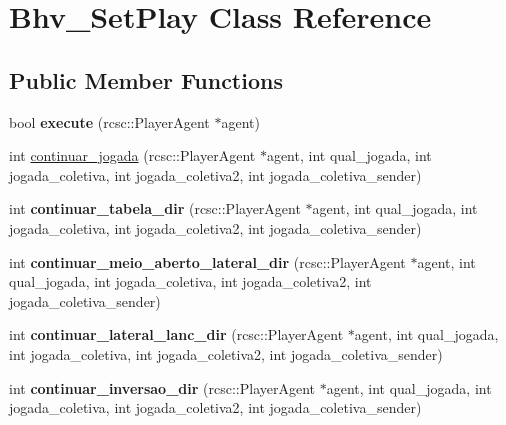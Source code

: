 \hypertarget{classBhv__SetPlay}{
\section{Bhv\_\-SetPlay Class Reference}
\label{classBhv__SetPlay}
}
\subsection*{Public Member Functions}
\begin{DoxyCompactItemize}
\item 
\hypertarget{classBhv__SetPlay_a6ba77fe4b32a7e96e334ca8d24c29bad}{
bool {\bfseries execute} (rcsc::PlayerAgent $\ast$agent)}
\label{classBhv__SetPlay_a6ba77fe4b32a7e96e334ca8d24c29bad}

\item 
int \hyperlink{classBhv__SetPlay_a344fa9403b413306fdcc2a45bcf789fd}{continuar\_\-jogada} (rcsc::PlayerAgent $\ast$agent, int qual\_\-jogada, int jogada\_\-coletiva, int jogada\_\-coletiva2, int jogada\_\-coletiva\_\-sender)
\item 
\hypertarget{classBhv__SetPlay_aa34f132c2014497259f9dd60c7b8700a}{
int {\bfseries continuar\_\-tabela\_\-dir} (rcsc::PlayerAgent $\ast$agent, int qual\_\-jogada, int jogada\_\-coletiva, int jogada\_\-coletiva2, int jogada\_\-coletiva\_\-sender)}
\label{classBhv__SetPlay_aa34f132c2014497259f9dd60c7b8700a}

\item 
\hypertarget{classBhv__SetPlay_ad0a353e783a8f84bff92bcc2e468b9eb}{
int {\bfseries continuar\_\-meio\_\-aberto\_\-lateral\_\-dir} (rcsc::PlayerAgent $\ast$agent, int qual\_\-jogada, int jogada\_\-coletiva, int jogada\_\-coletiva2, int jogada\_\-coletiva\_\-sender)}
\label{classBhv__SetPlay_ad0a353e783a8f84bff92bcc2e468b9eb}

\item 
\hypertarget{classBhv__SetPlay_a3ae875896a17cda20931ffecc1dceea3}{
int {\bfseries continuar\_\-lateral\_\-lanc\_\-dir} (rcsc::PlayerAgent $\ast$agent, int qual\_\-jogada, int jogada\_\-coletiva, int jogada\_\-coletiva2, int jogada\_\-coletiva\_\-sender)}
\label{classBhv__SetPlay_a3ae875896a17cda20931ffecc1dceea3}

\item 
\hypertarget{classBhv__SetPlay_a8d6e0f652de2e6dfa714d44958c50f55}{
int {\bfseries continuar\_\-inversao\_\-dir} (rcsc::PlayerAgent $\ast$agent, int qual\_\-jogada, int jogada\_\-coletiva, int jogada\_\-coletiva2, int jogada\_\-coletiva\_\-sender)}
\label{classBhv__SetPlay_a8d6e0f652de2e6dfa714d44958c50f55}


\end{DoxyCompactItemize}
